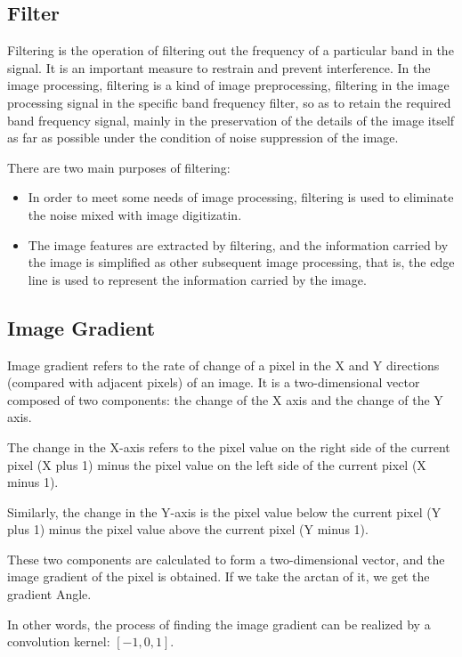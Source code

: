 \documentclass[review]{cvpr}
\begin{document}
\subsection{Filter}
Filtering is the operation of filtering out the frequency of a particular band in the signal. It is an important measure to restrain and prevent interference. In the image processing, filtering is a kind of image preprocessing, filtering in the image processing signal in the specific band frequency filter, so as to retain the required band frequency signal, mainly in the preservation of the details of the image itself as far as possible under the condition of noise suppression of the image.

There are two main purposes of filtering:

\begin{itemize}
\item In order to meet some needs of image processing, filtering is used to eliminate the noise mixed with image digitizatin.
\item The image features are extracted by filtering, and the information carried by the image is simplified as other subsequent image processing, that is, the edge line is used to represent the information carried by the image.
\end{itemize}

\subsection{Image Gradient}

Image gradient refers to the rate of change of a pixel in the X and Y directions (compared with adjacent pixels) of an image. It is a two-dimensional vector composed of two components: the change of the X axis and the change of the Y axis.

The change in the X-axis refers to the pixel value on the right side of the current pixel (X plus 1) minus the pixel value on the left side of the current pixel (X minus 1).

Similarly, the change in the Y-axis is the pixel value below the current pixel (Y plus 1) minus the pixel value above the current pixel (Y minus 1).

These two components are calculated to form a two-dimensional vector, and the image gradient of the pixel is obtained. If we take the arctan of it, we get the gradient Angle.

In other words, the process of finding the image gradient can be realized by a convolution kernel: $[-1,0,1]$.
\end{document}
